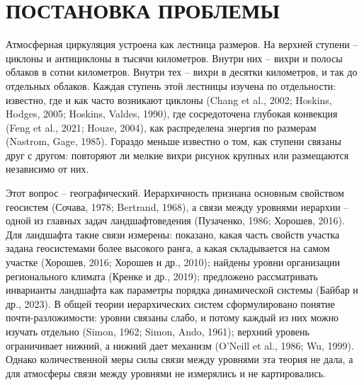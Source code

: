 \documentclass[12pt,a4paper]{article}
\begin{document}
\section{ПОСТАНОВКА ПРОБЛЕМЫ}

Атмосферная циркуляция устроена как лестница размеров. На верхней ступени -- циклоны и антициклоны в тысячи километров. Внутри них -- вихри и полосы облаков в сотни километров. Внутри тех -- вихри в десятки километров, и так до отдельных облаков. Каждая ступень этой лестницы изучена по отдельности: известно, где и как часто возникают циклоны (Chang et al., 2002; Hoskins, Hodges, 2005; Hoskins, Valdes, 1990), где сосредоточена глубокая конвекция (Feng et al., 2021; Houze, 2004), как распределена энергия по размерам (Nastrom, Gage, 1985). Гораздо меньше известно о том, как ступени связаны друг с другом: повторяют ли мелкие вихри рисунок крупных или размещаются независимо от них.

Этот вопрос -- географический. Иерархичность признана основным свойством геосистем (Сочава, 1978; Bertrand, 1968), а связи между уровнями иерархии -- одной из главных задач ландшафтоведения (Пузаченко, 1986; Хорошев, 2016). Для ландшафта такие связи измерены: показано, какая часть свойств участка задана геосистемами более высокого ранга, а какая складывается на самом участке (Хорошев, 2016; Хорошев и др., 2010); найдены уровни организации регионального климата (Кренке и др., 2019); предложено рассматривать инварианты ландшафта как параметры порядка динамической системы (Байбар и др., 2023). В общей теории иерархических систем сформулировано понятие почти-разложимости: уровни связаны слабо, и потому каждый из них можно изучать отдельно (Simon, 1962; Simon, Ando, 1961); верхний уровень ограничивает нижний, а нижний дает механизм (O'Neill et al., 1986; Wu, 1999). Однако количественной меры силы связи между уровнями эта теория не дала, а для атмосферы связи между уровнями не измерялись и не картировались.
\end{document}
